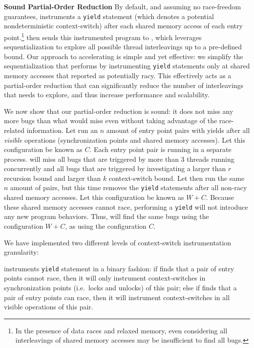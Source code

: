 \medskip\noindent\textbf{Sound Partial-Order Reduction }
%
By default, and assuming no race-freedom guarantees, \whoop instruments a \texttt{yield} statement (which denotes a potential nondeterministic context-switch) after each shared memory access of each entry point.\footnote{In the presence of data races and relaxed memory, even considering all interleavings of shared memory accesses may be insufficient to find all bugs.} \whoop then sends this instrumented program to \corral, which leverages sequentialization to explore all possible thread interleavings up to a pre-defined bound. Our approach to accelerating \corral is simple and yet effective: we simplify the sequentialization that \corral performs by instrumenting \texttt{yield} statements only at shared memory accesses that \whoop reported as potentially racy. This effectively acts as a partial-order reduction that can significantly reduce the number of interleavings that \corral needs to explore, and thus increase performance and scalability.

We now show that our partial-order reduction is sound: it does not miss any more bugs than what \corral would miss even without taking advantage of the \whoop race-related information. Let \corral run an $n$ amount of entry point pairs with yields after all \emph{visible} operations (synchronization points and shared memory accesses). Let this configuration be known as $C$. Each entry point pair is running in a separate \corral process. \corral will miss all bugs that are triggered by more than 3 threads running concurrently and all bugs that are triggered by investigating a larger than $r$ recursion bound and larger than $k$ context-switch bound. Let \corral then run the same $n$ amount of pairs, but this time \whoop removes the \texttt{yield} statements after all non-racy shared memory accesses. Let this configuration be known as $W+C$. Because these shared memory accesses cannot race, performing a \texttt{yield} will not introduce any new program behaviors. Thus, \corral will find the same bugs using the configuration $W+C$, as using the configuration $C$.

We have implemented two different levels of context-switch instrumentation granularity:

\yieldcoarse instruments \texttt{yield} statement in a binary fashion: if \whoop
finds that a pair of entry points cannot race, then it will only instrument
context-switches in synchronization points (i.e.\ locks and unlocks) of this pair; else if \whoop finds
that a pair of entry points can race, then it will instrument context-switches
in all visible operations of this pair.

